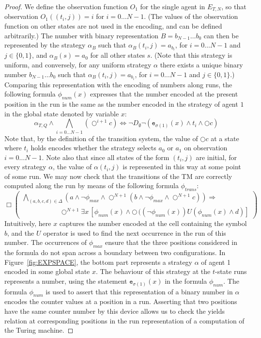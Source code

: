 \documentclass[a4wide]{article}
\newcommand{\until}{U}
\newcommand{\dimp}{\Leftrightarrow}
\theoremstyle{examplesty}
\newcommand{\lid}[2]{\mathtt{e}_{#1}(#2)}
\newcommand{\rimp}{\Rightarrow}
\newcommand{\Env}{E}
\newcommand{\nxt}{\Circle}
\begin{document}
\begin{proof}
We define the observation function $O_1$ for the single agent in 
$\Env_{T,N}$, so that 
observation 
$O_1((t_i,j)) = i$ 
for 
$i=0\ldots N-1$. 
(The values of the 
observation function on other states are not used in the encoding, and can be defined arbitrarily.)  
The number with binary representation $B= b_{N-1} \ldots b_0$ can then be represented 
by the  strategy $\alpha_B$ such that 
$\alpha_B(t_i,j) = a_{b_i}$,
 for $i= 0\ldots N-1$
and  $j\in \{0,1\}$, and $\alpha_B(s) = a_0$ for all other states $s$. (Note that this strategy is uniform, and conversely, for any 
 uniform strategy $\alpha$ there exists a unique binary number $b_{N-1} \ldots b_0$ such that  
$\alpha_B(t_i,j) = a_{b_i}$,  for $i= 0\ldots N-1$ and  $j\in \{0,1\}$.) 
Comparing this representation with the encoding of numbers along runs, 
the following formula $\phi_{num}(x)$ expresses 
that the number  encoded at the present position in the run is the 
same as the number encoded in the strategy of agent $1$ in the global state denoted by
variable $x$: 
$$
\alpha_{T,Q} \land \bigwedge_{i=0\ldots N-1} (\nxt^{i+1} c) \dimp \neg D_\emptyset \neg ( \lid{\sigma(1)}{x} \land t_i \land \nxt c) 
$$ 
Note that, by the definition of the transition system, 
the value of $\nxt c$ at a state where $t_i$ holds encodes
whether the strategy selects $a_0$ or $a_1$ on observation $i=0\ldots N-1$. 
Note also that since all states of the form $(t_i,j)$ are initial, for every strategy $\alpha$,  the value of $\alpha(t_i,j)$
is represented in this way at some point of some run. 
We may now check that the transitions of the TM are correctly computed along the 
run by means of the following formula $\phi_{trans}$: 
$$
  \Box \left(
  \begin{array}{l} 
  \bigwedge_{(a,b,c,d) \in \Delta} 
  (a \land \neg \phi_{max} \land \nxt^{N+1} (b \land \neg \phi_{max} \land 
\nxt^{N+1} c))
  \rimp \\
  ~~~~~~~~~~~~~~~~~~~~~~~~~
   \nxt^{N+1} \exists x \, [\phi_{num}(x) \land  \nxt \, ( (\neg \phi_{num}(x)) \until (\phi_{num}(x) \land d )]
   \end{array}
   \right)
$$
Intuitively, here $x$ captures the number encoded at the cell containing the symbol $b$, 
and the $\until$ operator is used to find the next occurrence in the run of this number. 
The occurrences of $\phi_{max}$ ensure that the three positions considered in the formula
do not span across a boundary between two configurations. 
In Figure~\ref{fig:EXPSPACE}, the bottom part represents a strategy 
$\alpha$
of agent 1 encoded in 
some global state $x$. The behaviour of this strategy at the $t$-state runs represents a number, using 
the statement  $\lid{\sigma(1)}{x}$ in the formula $\phi_{num}$. 
The formula $\phi_{num}$ is used to assert that this representation of a binary number in $\alpha$ encodes 
the counter values at a position in a run. Asserting that two positions have the same counter number by this device
allows us to check the yields relation at corresponding positions in the run representation of a computation of the Turing machine. 



\end{proof}
\end{document}
